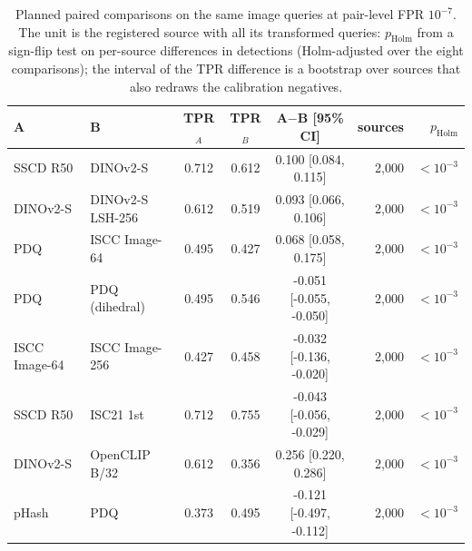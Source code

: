 \begin{table}[!t]
\centering
\footnotesize
\caption{Planned paired comparisons on the same image queries at pair-level FPR $10^{-7}$. The unit is the registered source with all its transformed queries: $p_{\mathrm{Holm}}$ from a sign-flip test on per-source differences in detections (Holm-adjusted over the eight comparisons); the interval of the TPR difference is a bootstrap over sources that also redraws the calibration negatives.}
\label{tab:paired}
\setlength{\tabcolsep}{3pt}
\begin{tabular}{llcccrr}
\toprule
A & B & TPR$_A$ & TPR$_B$ & A$-$B [95\% CI] & sources & $p_{\mathrm{Holm}}$ \\
\midrule
SSCD R50 & DINOv2-S & 0.712 & 0.612 & 0.100 \tiny[0.084, 0.115] & 2{,}000 & $<10^{-3}$ \\
DINOv2-S & DINOv2-S LSH-256 & 0.612 & 0.519 & 0.093 \tiny[0.066, 0.106] & 2{,}000 & $<10^{-3}$ \\
PDQ & ISCC Image-64 & 0.495 & 0.427 & 0.068 \tiny[0.058, 0.175] & 2{,}000 & $<10^{-3}$ \\
PDQ & PDQ (dihedral) & 0.495 & 0.546 & -0.051 \tiny[-0.055, -0.050] & 2{,}000 & $<10^{-3}$ \\
ISCC Image-64 & ISCC Image-256 & 0.427 & 0.458 & -0.032 \tiny[-0.136, -0.020] & 2{,}000 & $<10^{-3}$ \\
SSCD R50 & ISC21 1st & 0.712 & 0.755 & -0.043 \tiny[-0.056, -0.029] & 2{,}000 & $<10^{-3}$ \\
DINOv2-S & OpenCLIP B/32 & 0.612 & 0.356 & 0.256 \tiny[0.220, 0.286] & 2{,}000 & $<10^{-3}$ \\
pHash & PDQ & 0.373 & 0.495 & -0.121 \tiny[-0.497, -0.112] & 2{,}000 & $<10^{-3}$ \\
\bottomrule
\end{tabular}

\end{table}
